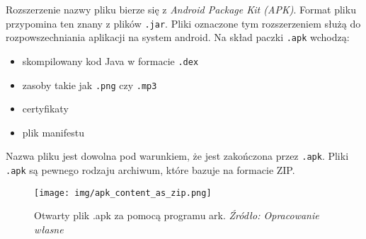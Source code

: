 \documentclass[12pt,a4paper,leqno,oneside,titlepage]{book}
\begin{document}
Rozszerzenie nazwy pliku bierze się z \emph{Android Package Kit (APK)}\cite{DexFormat,AndroidSourceDexFormat,HowAPK}.
Format pliku przypomina ten znany z plików \verb|.jar|.
Pliki oznaczone tym rozszerzeniem służą do rozpowszechniania aplikacji na system android. Na skład paczki \verb|.apk| wchodzą:
%
\begin{itemize}
\item skompilowany kod Java w formacie \verb|.dex|
\item zasoby takie jak \verb|.png| czy \verb|.mp3|
\item certyfikaty
\item plik manifestu
\end{itemize}
%
Nazwa pliku jest dowolna pod warunkiem, że jest zakończona przez \verb|.apk|.
Pliki \verb|.apk| są pewnego rodzaju archiwum, które bazuje na formacie ZIP.
\begin{figure}[H]
	\centering
	\texttt{[image: img/apk\_content\_as\_zip.png]}
	\caption{Otwarty plik .apk za pomocą programu ark. \emph{Źródło: Opracowanie własne}}
\end{figure}
%
\end{document}
